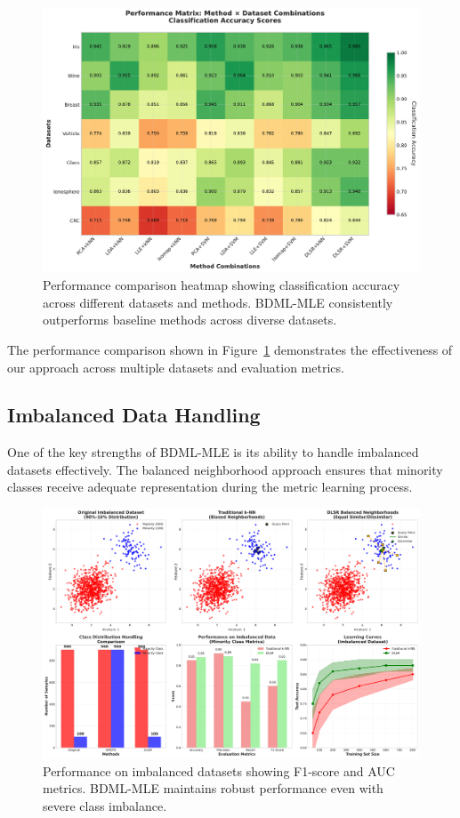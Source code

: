 \documentclass[review]{elsarticle}
\begin{document}
\begin{figure}[htbp]
\centering
\includegraphics[width=\textwidth]{performance_heatmap.pdf}
\caption{Performance comparison heatmap showing classification accuracy across different datasets and methods. BDML-MLE consistently outperforms baseline methods across diverse datasets.}
\label{fig:performance_heatmap}
\end{figure}

The performance comparison shown in Figure~\ref{fig:performance_heatmap} demonstrates the effectiveness of our approach across multiple datasets and evaluation metrics.

\subsection{Imbalanced Data Handling}

One of the key strengths of BDML-MLE is its ability to handle imbalanced datasets effectively. The balanced neighborhood approach ensures that minority classes receive adequate representation during the metric learning process.

\begin{figure}[htbp]
\centering
\includegraphics[width=\textwidth]{imbalanced_data_handling.pdf}
\caption{Performance on imbalanced datasets showing F1-score and AUC metrics. BDML-MLE maintains robust performance even with severe class imbalance.}
\label{fig:imbalanced_handling}
\end{figure}
\end{document}
